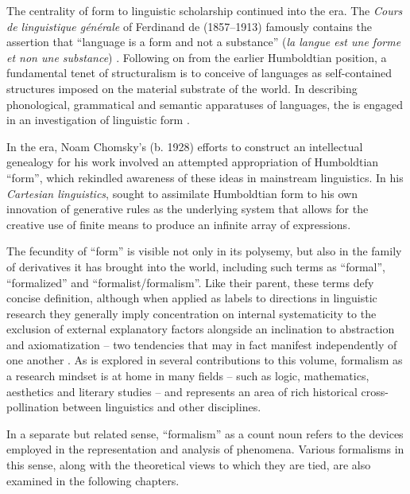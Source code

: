 \documentclass[output=paper]{langscibook}
\begin{document}
The centrality of form to linguistic scholarship continued into the  era. The \emph{Cours de linguistique générale} of Ferdinand de {\Saussure} (1857--1913) famously contains the assertion that ``language is a form and not a substance'' (\emph{la langue est une forme et non une substance}) \citep[169]{Saussure19221916}. Following on from the earlier Humboldtian position, a fundamental tenet of structuralism is to conceive of languages as self-contained structures imposed on the material substrate of the world. In describing phonological, grammatical and semantic apparatuses of languages, the  is engaged in an investigation of linguistic form \citep[for a classical  account couched in these terms, see][54--70]{Lyons1968}.

In the  era, Noam Chomsky's (b. 1928) efforts to construct an intellectual genealogy for his work involved an attempted appropriation of Humboldtian ``form'', which  rekindled awareness of these ideas in mainstream linguistics. In his \emph{Cartesian linguistics}, \citet[69--77]{Chomsky20091966} sought to assimilate Humboldtian form to his own innovation of generative rules as the underlying system that allows for the creative use of finite means to produce an infinite array of expressions.

The fecundity of ``form'' is visible not only in its polysemy, but also in the family of derivatives it has brought into the world, including such terms as ``formal'', ``formalized'' and ``formalist/formalism''. Like their parent, these terms defy concise definition, although when applied as labels to directions in linguistic research they generally imply concentration on internal systematicity to the exclusion of external explanatory factors alongside an inclination to abstraction and axiomatization -- two tendencies that may in fact manifest independently of one another \citep[cf.][]{Newmeyer1998}. As is explored in several contributions to this volume, formalism as a research mindset is at home in many fields -- such as logic, mathematics, aesthetics and literary studies -- and represents an area of rich historical cross-pollination between linguistics and other disciplines. 

\largerpage[1]\label{p:pref:devices}In a separate but related sense, ``formalism'' as a count noun refers to the devices employed in the representation and analysis of phenomena. Various formalisms in this sense, along with the theoretical views to which they are tied, are also examined in the following chapters.
\end{document}
